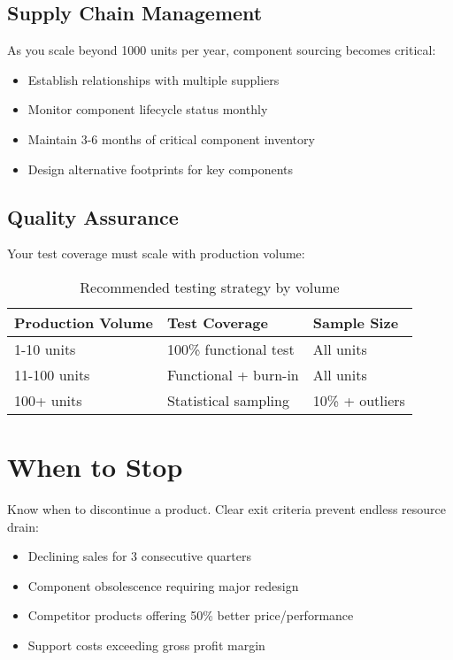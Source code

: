 \subsection{Supply Chain Management}

As you scale beyond 1000 units per year, component sourcing becomes critical:

\begin{itemize}
\item Establish relationships with multiple suppliers
\item Monitor component lifecycle status monthly
\item Maintain 3-6 months of critical component inventory
\item Design alternative footprints for key components
\end{itemize}

\subsection{Quality Assurance}

Your test coverage must scale with production volume:

\begin{table}[h]
\centering
\begin{tabular}{|l|l|l|}
\hline
\textbf{Production Volume} & \textbf{Test Coverage} & \textbf{Sample Size} \\
\hline
1-10 units & 100\% functional test & All units \\
11-100 units & Functional + burn-in & All units \\
100+ units & Statistical sampling & 10\% + outliers \\
\hline
\end{tabular}
\caption{Recommended testing strategy by volume}
\end{table}

\section{When to Stop}

Know when to discontinue a product. Clear exit criteria prevent endless resource drain:

\begin{itemize}
\item Declining sales for 3 consecutive quarters
\item Component obsolescence requiring major redesign
\item Competitor products offering 50\% better price/performance
\item Support costs exceeding gross profit margin
\end{itemize}


